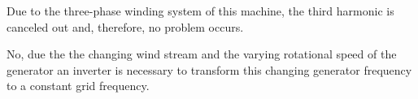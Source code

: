
\begin{solutionblock}
    Due to the three-phase winding system of this machine, the third harmonic is canceled out and, therefore, no problem occurs.
\end{solutionblock}



\begin{solutionblock}
    No, due the the changing wind stream and the varying rotational speed of the generator an inverter is necessary to transform this changing generator frequency to a constant grid frequency.
\end{solutionblock}






